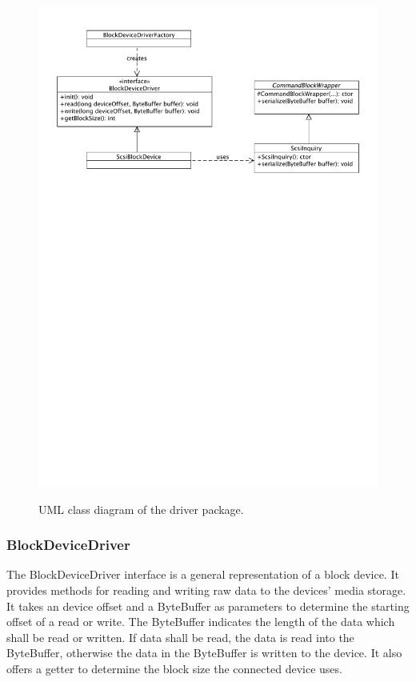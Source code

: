 \begin{figure}[h!]
\caption{UML class diagram of the driver package.}
\centering
\includegraphics[scale=0.85]{figures/driver_package}
\label{figure:driver_package}
\end{figure}

\subsubsection{BlockDeviceDriver}

The BlockDeviceDriver interface is a general representation of a block device. It provides methods for reading and writing raw data to the devices' media storage. It takes an device offset and a ByteBuffer as parameters to determine the starting offset of a read or write. The ByteBuffer indicates the length of the data which shall be read or written. If data shall be read, the data is read into the ByteBuffer, otherwise the data in the ByteBuffer is written to the device. It also offers a getter to determine the block size the connected device uses.

